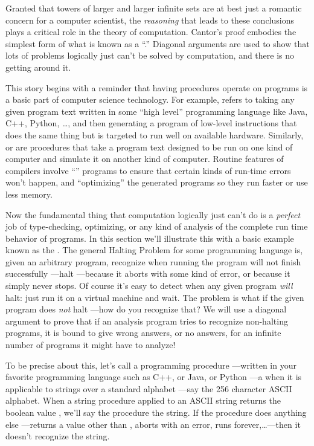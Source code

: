 Granted that towers of larger and larger infinite sets are at best just
a romantic concern for a computer scientist, the \emph{reasoning} that
leads to these conclusions plays a critical role in the theory of
computation.  Cantor's proof embodies the simplest form of what is
known as a ``.''  Diagonal arguments are used
to show that lots of problems logically just can't be solved
by computation, and there is no getting around it.

This story begins with a reminder that having procedures operate on
programs is a basic part of computer science technology.  For example,
\emph{} refers to taking any given program text
written in some ``high level'' programming language like Java, C++,
Python, \dots, and then generating a program of low-level instructions
that does the same thing but is targeted to run well on available
hardware.  Similarly, \emph{} or \emph{} are procedures that take a program text designed to be
run on one kind of computer and simulate it on another kind of
computer.  Routine features of compilers involve
``'' programs to ensure that certain kinds of
run-time errors won't happen, and ``optimizing'' the generated
programs so they run faster or use less memory.

Now the fundamental thing that computation logically just can't do is
a \emph{perfect} job of type-checking, optimizing, or any kind of
analysis of the complete run time behavior of programs.  In this
section we'll illustrate this with a basic example known as the
.  The general Halting Problem for some
programming language is, given an arbitrary program, recognize when
running the program will not finish successfully ---halt ---because it
aborts with some kind of error, or because it simply never stops.  Of
course it's easy to detect when any given program \emph{will} halt:
just run it on a virtual machine and wait.  The problem is what if the
given program does \emph{not} halt ---how do you recognize that?  We
will use a diagonal argument to prove that if an analysis program
tries to recognize non-halting programs, it is bound to give wrong
answers, or no answers, for an infinite number of programs it might
have to analyze!

To be precise about this, let's call a programming procedure
---written in your favorite programming language such as C++, or Java, or
Python ---a  when it is applicable to strings
over a standard alphabet ---say the 256 character ASCII alphabet.
When a string procedure applied to an ASCII string returns the boolean
value \True, we'll say the procedure  the string.  If
the procedure does anything else ---returns a value other than \True,
aborts with an error, runs forever,\dots ---then it doesn't recognize
the string.

